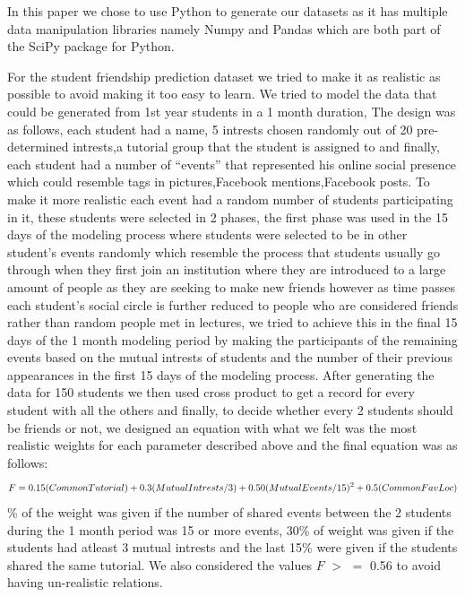 In this paper we chose to use Python to generate our datasets as it has multiple data manipulation libraries namely Numpy and Pandas which are both part of the SciPy package for Python\cite{SciPy}.\par

For the student friendship prediction dataset we tried to make it as realistic as possible to avoid making it too easy to learn. We tried to model the data that could be generated from 1st year students in a 1 month duration, The design was as follows, each student had a name, 5 intrests chosen randomly out of 20 pre-determined intrests,a tutorial group
that the student is assigned to and finally, each student had a number of “events” that represented his online social presence which could resemble tags in pictures,Facebook mentions,Facebook posts.
To make it more realistic each event had a random number of students participating in it, these students were selected in 2 phases, the first phase was used in the 15 days of the modeling process
where students were selected to be in other student's events randomly which resemble the process that students usually go through when they first join an institution where they are introduced to a large amount of
people as they are seeking to make new friends however as time passes each student's social circle is further reduced to people who are considered friends rather than random people met in lectures, we tried to achieve this
in the final 15 days of the 1 month modeling period by making the participants of the remaining events based on the mutual intrests of students and the number of their previous appearances in the first 15 days of the modeling process.
After generating the data for 150 students we then used cross product to get a record for every student with all the others and finally, to decide whether every 2 students should be friends or not, we designed an equation with what we felt
was the most realistic weights for each parameter described above and the final equation was as follows:
\begin{equation}
\small
F=0.15(CommonTutorial)+0.3(MutualIntrests/3)+0.50(MutualEvents/15)^2 +0.5(CommonFavLoc)
\end{equation}
\% of the weight was given if the number of shared events between the 2 students during the 1 month period was 15 or more events, 30\% of weight was given if the students had atleast 3 mutual intrests
and the last 15\% were given if the students shared the same tutorial. We also considered the values $F$  $>$ $=$ 0.56 to avoid having un-realistic relations.
